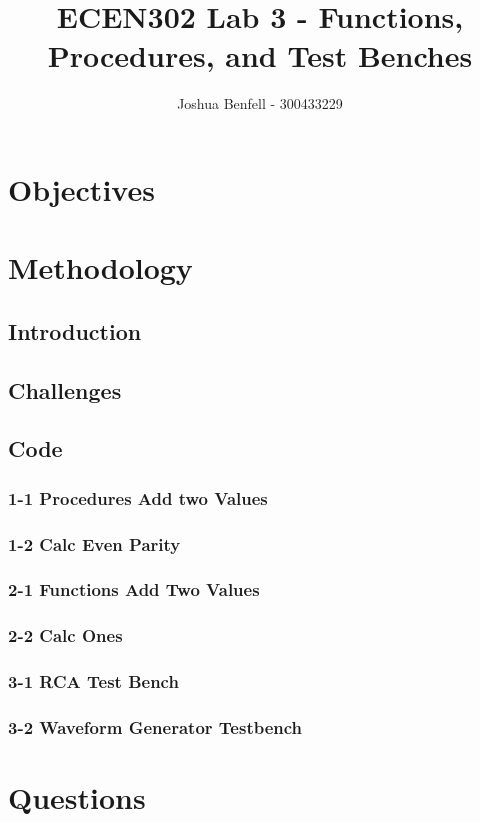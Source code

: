 \documentclass[a4paper, 12pt]{article}
\title{ECEN302 Lab 3 - Functions, Procedures, and Test Benches}
\author{Joshua Benfell - 300433229}
\begin{document}
	\maketitle
	
	\section{Objectives}
	\section{Methodology}
		\subsection{Introduction}
			
		\subsection{Challenges}

		\subsection{Code}
			\subsubsection{1-1 Procedures Add two Values}
				
				
			\subsubsection{1-2 Calc Even Parity}
				
				
			\subsubsection{2-1 Functions Add Two Values}
				
				
			\subsubsection{2-2 Calc Ones}
				
				
			\subsubsection{3-1 RCA Test Bench}
				
			\subsubsection{3-2 Waveform Generator Testbench}
				




	\section{Questions}



\end{document}
